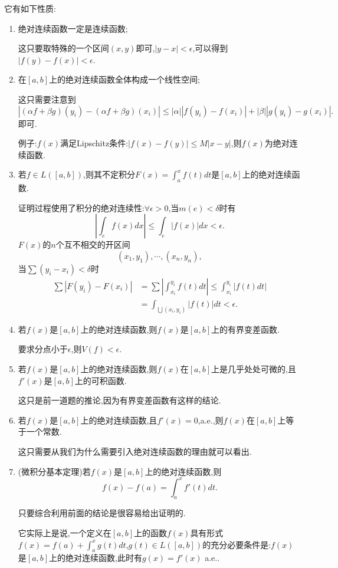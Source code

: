 \documentclass[12pt,a4paper,openany]{book}
\begin{document}
它有如下性质:
\begin{enumerate}
\item 绝对连续函数一定是连续函数;

这只要取特殊的一个区间$(x,y)$即可,$|y-x|<\epsilon$,可以得到$|f(y)-f(x)|<\epsilon$.

\item 在$[a,b]$上的绝对连续函数全体构成一个线性空间;

这只需要注意到
\[
|(\alpha{f}+\beta{g})(y_i) - (\alpha{f}+\beta{g})(x_i)| \le |\alpha||f(y_i)-f(x_i)| + |\beta||g(y_i)-g(x_i)|.
\]
即可.

例子:$f(x)$满足Lipschitz条件:$|f(x)-f(y)|\le M|x-y|$,则$f(x)$为绝对连续函数.

\item 若$f \in L([a,b])$,则其不定积分$F(x)=\int_{a}^{x}{f(t)dt}$是$[a,b]$上的绝对连续函数.

证明过程使用了积分的绝对连续性:$\forall \epsilon>0$,当$m(e)<\delta$时有
\[
|\int_{e}{f(x)dx}|\le\int_{e}{|f(x)|dx}<\epsilon.
\]
$F(x)$的$n$个互不相交的开区间
\[
(x_1,y_1),\cdots,(x_n,y_n),
\]
当$\sum(y_i-x_i) < \delta$时
\[
\begin{aligned}
\sum|F(y_i) - F(x_i)| &= \sum{|\int_{x_i}^{y_i}{f(t)dt}|} \le \int_{x_i}^{y_i}{|f(t)dt|} \\
&= \int_{\bigcup(x_i,y_i)}{|f(t)|dt} < \epsilon.
\end{aligned}
\]

\item 若$f(x)$是$[a,b]$上的绝对连续函数,则$f(x)$是$[a,b]$上的有界变差函数.

要求分点小于$\epsilon$,则$V(f)<\epsilon$.

\item 若$f(x)$是$[a,b]$上的绝对连续函数,则$f(x)$在$[a,b]$上是几乎处处可微的,且$f'(x)$是$[a,b]$上的可积函数.

这只是前一道题的推论,因为有界变差函数有这样的结论.

\item 若$f(x)$是$[a,b]$上的绝对连续函数,且$f'(x)=0$,a.e.,则$f(x)$在$[a,b]$上等于一个常数.

这只需要从我们为什么需要引入绝对连续函数的理由就可以看出.

\item (微积分基本定理)若$f(x)$是$[a,b]$上的绝对连续函数,则
\[
f(x)-f(a) = \int_{a}^{x}{f'(t)dt}.
\]

只要综合利用前面的结论是很容易给出证明的.

它实际上是说,一个定义在$[a,b]$上的函数$f(x)$具有形式$f(x)=f(a)+\int_{a}^{x}{g(t)dt}$,$g(t) \in L([a,b])$的充分必要条件是:$f(x)$是$[a,b]$上的绝对连续函数,此时有$g(x)=f'(x)$ a.e..


\end{enumerate}
\end{document}

